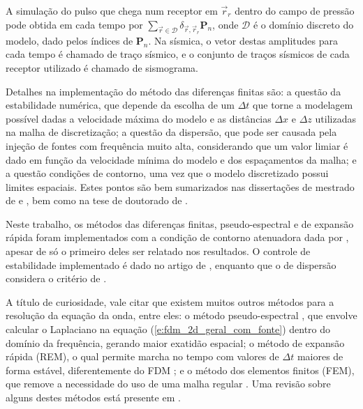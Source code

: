     A simulação do pulso que chega num receptor em $\vec{r}_r$ dentro do campo de pressão pode \DIFdelbegin {}\DIFdelend \DIFaddbegin {}\DIFaddend obtida em cada tempo por $\sum_{\vec{r} \in \mathcal{D}} \delta_{\vec{r}, \vec{r}_r} {\boldsymbol{P}_n}$, onde $\mathcal{D}$ é o domínio discreto do modelo, dado pelos índices de $\boldsymbol{P}_n$. Na sísmica, o vetor destas amplitudes para cada tempo é chamado de traço sísmico, e o conjunto de traços sísmicos de cada receptor utilizado é chamado de sismograma.

    Detalhes na implementação do método das diferenças finitas são: a questão da estabilidade numérica, que depende da escolha de um $\Delta t$ que torne a modelagem possível dadas a velocidade máxima do modelo e as distâncias $\Delta x$ e $\Delta z$ utilizadas na malha de discretização; a questão da dispersão, que pode ser causada pela injeção de fontes com frequência muito alta, considerando que um valor limiar é dado em função da velocidade mínima do modelo e dos espaçamentos da malha; e a questão condições de contorno, uma vez que o modelo discretizado possui limites espaciais. Estes pontos são bem sumarizados nas dissertações de mestrado de  e , bem como na tese de doutorado de .

    Neste trabalho, os métodos das diferenças finitas, pseudo-espectral e de expansão rápida foram implementados com a condição de contorno atenuadora dada por , apesar de só o primeiro deles ser relatado nos resultados. O controle de estabilidade implementado é dado no artigo de , enquanto que o de dispersão considera o critério de .

    A título de curiosidade, vale citar que existem muitos outros métodos para a resolução da equação da onda, entre eles: o método pseudo-espectral \DIFdelbegin %
\DIFdelend \DIFaddbegin {}\DIFaddend , que envolve calcular o Laplaciano na equação (\ref{e:fdm_2d_geral_com_fonte}) dentro do domínio da frequência, gerando maior exatidão espacial; o método de expansão rápida (\DIFaddbegin \textit{}\DIFadd{, }\DIFaddend REM), o qual permite marcha no tempo com valores de $\Delta t$ maiores de forma estável, diferentemente do FDM ; e o método dos elementos finitos (\DIFaddbegin \textit{}\DIFadd{, }\DIFaddend FEM), que remove a necessidade do uso de uma malha regular . Uma revisão sobre alguns destes métodos está presente em .

